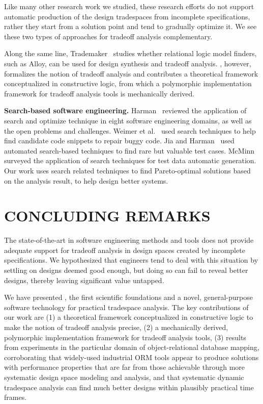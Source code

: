 \documentclass{sig-alternate}
\begin{document}
Like many other research work we studied, these research efforts do not support automatic production of the design tradespaces from incomplete specifications, rather they start from a solution point and tend to gradually optimize it. We see these two types of approaches for tradeoff analysis complementary.

Along the same line, Trademaker~\cite{trademaker} studies whether relational logic model finders, such as Alloy, can be used for design synthesis and tradeoff analysis.  \@approach, however, formalizes the notion of tradeoff analysis and contributes a theoretical framework conceptualized in constructive logic, from which a  polymorphic implementation framework for tradeoff analysis tools is mechanically derived. 


\textbf{Search-based software engineering.} Harman~\cite{harman_search_future} reviewed the application of search and optimize technique in eight software engineering domains, as well as the open problems and challenges. Weimer et al.~\cite{weimer_genetic_repaire} used search techniques to help find candidate code snippets to repair buggy code. Jia and Harman~\cite{jia_higherorder_test} used automated search-based techniques to find rare but valuable test cases. McMinn~\cite{MacMinn_test_generation} surveyed the application of search techniques for test data automatic generation. Our work uses search related techniques to find Pareto-optimal solutions based on the analysis result, to help design better systems.



\section{CONCLUDING REMARKS}
The state-of-the-art in software engineering methods and tools does not provide adequate support for tradeoff analysis in design spaces created by incomplete specifications. We hypothesized that engineers tend to deal with this situation by settling on designs deemed good enough, but doing so can fail to reveal better designs, thereby leaving significant value untapped. 

We have presented \@approach, the first scientific foundations and a novel, general-purpose software technology for practical tradespace analysis. The key contributions of our work are (1) a theoretical framework conceptualized in constructive logic to make the notion of tradeoff analysis precise, (2) a mechanically derived, polymorphic implementation framework for tradeoff analysis tools, (3) results from experiments in the particular domain of object-relational database mapping, corroborating that widely-used industrial ORM tools appear to produce solutions with performance properties that are far from those achievable through more systematic design space modeling and analysis, and that systematic dynamic tradespace analysis can find much better designs within plausibly practical time frames. 
 
\end{document}
